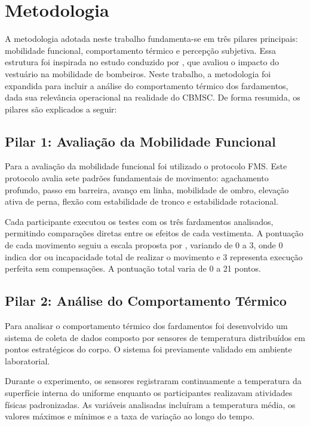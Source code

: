 \chapter{Metodologia}
\label{cap:metodologia}

A metodologia adotada neste trabalho fundamenta-se em três pilares principais: mobilidade funcional, 
comportamento térmico e percepção subjetiva. Essa estrutura foi inspirada no estudo conduzido por 
\textcite{orr2019impact}, que avaliou o impacto do vestuário na mobilidade de bombeiros. 
Neste trabalho, a metodologia foi expandida para incluir a análise do comportamento térmico dos 
fardamentos, dada sua relevância operacional na realidade do CBMSC. De forma resumida, os pilares 
são explicados a seguir:

\section{Pilar 1: Avaliação da Mobilidade Funcional}

Para a avaliação da mobilidade funcional foi utilizado o protocolo \acrfull{FMS}. 
Este protocolo avalia sete padrões fundamentais de movimento: agachamento profundo, passo em barreira, 
avanço em linha, mobilidade de ombro, elevação ativa de perna, flexão com estabilidade de tronco e 
estabilidade rotacional.

Cada participante executou os testes com os três fardamentos analisados, permitindo comparações 
diretas entre os efeitos de cada vestimenta. A pontuação de cada movimento seguiu a escala proposta 
por \textcite{cook2006pre}, variando de 0 a 3, onde 0 indica dor ou incapacidade total de realizar o 
movimento e 3 representa execução perfeita sem compensações. A pontuação total varia de 0 a 21 pontos.

\section{Pilar 2: Análise do Comportamento Térmico}

Para analisar o comportamento térmico dos fardamentos foi desenvolvido um sistema de coleta de dados 
composto por sensores de temperatura distribuídos em pontos estratégicos do corpo. O sistema foi 
previamente validado em ambiente laboratorial.

Durante o experimento, os sensores registraram continuamente a temperatura da superfície 
interna do uniforme enquanto os participantes realizavam atividades físicas padronizadas. As variáveis 
analisadas incluíram a temperatura média, os valores máximos e mínimos e a taxa de variação ao longo 
do tempo.


